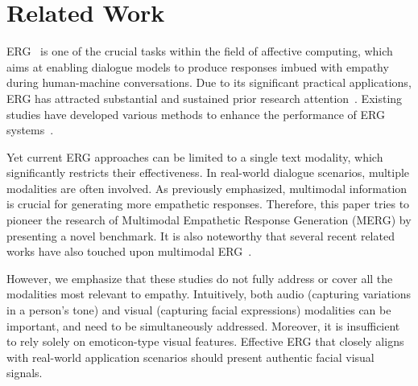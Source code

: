 \section{Related Work}
ERG~\cite{raamkumar2022empathetic,qian2023harnessing} is one of the crucial tasks within the field of affective computing, which aims at enabling dialogue models to produce responses imbued with empathy during human-machine conversations. 
Due to its significant practical applications, ERG has attracted substantial and sustained prior research attention~\cite{lin2019moel,zhou2022case,fei2024empathyear}. 
Existing studies have developed various methods to enhance the performance of ERG systems~\cite{gao2021improving,yang2024enhancing,sabour2022cem,chen2024empathetic}. 

Yet current ERG approaches can be limited to a single text modality, which significantly restricts their effectiveness. 
In real-world dialogue scenarios, multiple modalities are often involved. 
As previously emphasized, multimodal information is crucial for generating more empathetic responses. 
Therefore, this paper tries to pioneer the research of Multimodal Empathetic Response Generation (MERG) by presenting a novel benchmark. 
It is also noteworthy that several recent related works have also touched upon multimodal ERG~\cite{yan-etal-2024-talk,zhang-etal-2024-stickerconv}. 

However, we emphasize that these studies do not fully address or cover all the modalities most relevant to empathy. 
Intuitively, both audio (capturing variations in a person’s tone) and visual (capturing facial expressions) modalities can be important, and need to be simultaneously addressed. 
Moreover, it is insufficient to rely solely on emoticon-type visual features. 
Effective ERG that closely aligns with real-world application scenarios should present authentic facial visual signals.







